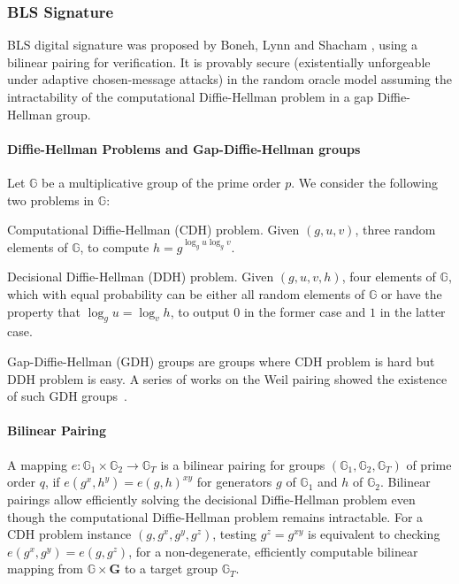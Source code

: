 \subsubsection{BLS Signature}
BLS digital signature was proposed by Boneh, Lynn and Shacham \cite{DBLP:journals/joc/BonehLS04}, using a bilinear pairing for verification. It is provably secure (existentially unforgeable under adaptive chosen-message attacks) in the random oracle model assuming the intractability of the computational Diffie-Hellman problem in a gap Diffie-Hellman group. 

\paragraph{Diffie-Hellman Problems and Gap-Diffie-Hellman groups} Let $\mathbb{G}$ be a multiplicative group of the prime order $p$. We consider the following two problems in $\mathbb{G}$:
\begin{definition} Computational Diffie-Hellman (CDH) problem. 
    Given $(g, u, v)$, three random elements of $\mathbb{G}$, to compute $h=g^{\log_g u \log_g v}$. 
\end{definition}

\begin{definition} Decisional Diffie-Hellman (DDH) problem. 
    Given $(g, u, v, h)$, four elements of $\mathbb{G}$, which with equal probability can be either all random elements of $\mathbb{G}$ or have the property that $\log_g u = \log_v h$, to output $0$ in the former case and $1$ in the latter case. 
\end{definition}

Gap-Diffie-Hellman (GDH) groups are groups where CDH problem is hard but DDH problem is easy. A series of works on the Weil pairing showed the existence of such GDH groups~\cite{DBLP:conf/crypto/BonehF01}. 

\paragraph{Bilinear Pairing} A mapping $e: \mathbb{G}_1\times \mathbb{G}_2\to \mathbb{G}_T$ is a bilinear pairing for groups $(\mathbb{G}_1, \mathbb{G}_2, \mathbb{G}_T)$ of prime order $q$, if $e(g^x, h^y) = e(g, h)^{xy}$ for generators $g$ of $\mathbb{G}_1$ and $h$ of $\mathbb{G}_2$. Bilinear pairings allow efficiently solving the decisional Diffie-Hellman problem even though the computational Diffie-Hellman problem remains intractable. For a CDH problem instance $(g, g^x, g^y, g^z)$, testing $g^z=g^{xy}$ is equivalent to checking $e(g^x, g^y) = e(g, g^z)$, for a non-degenerate, efficiently computable bilinear mapping from $\mathbb{G}\times \mathbf{G}$ to a target group $\mathbb{G}_T$. 


